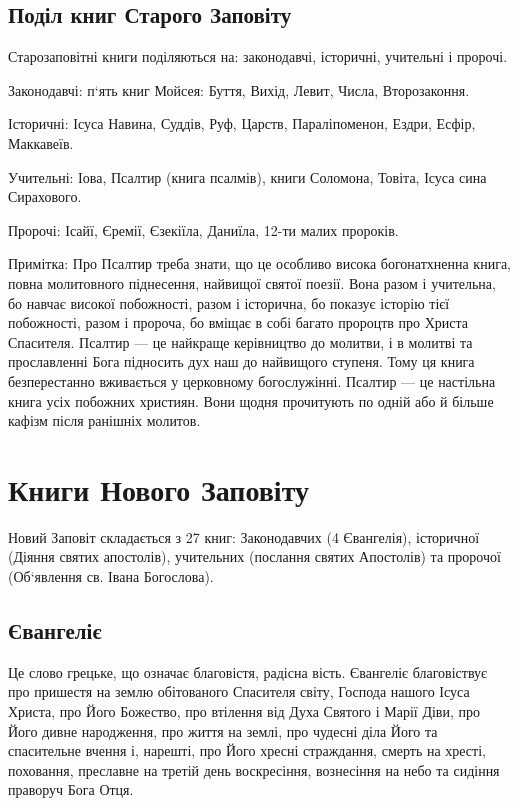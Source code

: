 \documentclass[main.tex]{subfiles}
\begin{document}
\subsection{Поділ книг Старого Заповіту}

\noindent Старозаповітні книги поділяються на: законодавчі, історичні, учительні і пророчі.

\noindent Законодавчі: п`ять книг Мойсея: Буття, Вихід, Левит, Числа, Второзаконня.

\noindent Історичні: Ісуса Навина, Суддів, Руф, Царств, Параліпоменон, Ездри, Есфір, Маккавеїв.

\noindent Учительні: Іова, Псалтир (книга псалмів), книги Соломона, Товіта, Ісуса сина Сирахового.

Пророчі: Ісайї, Єремії, Єзекіїла, Даниїла, 12-ти малих пророків.

Примітка: Про Псалтир треба знати, що це особливо висока богонатхненна книга, повна молитовного піднесення, найвищої святої поезії. Вона разом і учительна, бо навчає високої побожності, разом і історична, бо показує історію тієї побожності, разом і пророча, бо вміщає в собі багато пророцтв про Христа Спасителя. Псалтир — це найкраще керівництво до молитви, і в молитві та прославленні Бога підносить дух наш до найвищого ступеня. Тому ця книга безперестанно вживається у церковному богослужінні. Псалтир — це настільна книга усіх побожних християн. Вони щодня прочитують по одній або й більше кафізм після ранішніх молитов.

\section{Книги Нового Заповіту}

Новий Заповіт складається з 27 книг: Законодавчих (4 Євангелія), історичної (Діяння святих апостолів), учительних (послання святих Апостолів) та пророчої (Об`явлення св. Івана Богослова).

\subsection{Євангеліє}

Це слово грецьке, що означає благовістя, радісна вість. Євангеліє благовіствує про пришестя на землю обітованого Спасителя світу, Господа нашого Ісуса Христа, про Його Божество, про втілення від Духа Святого і Марії Діви, про Його дивне народження, про життя на землі, про чудесні діла Його та спасительне вчення і, нарешті, про Його хресні страждання, смерть на хресті, поховання, преславне на третій день воскресіння, вознесіння на небо та сидіння праворуч Бога Отця.
\end{document}
